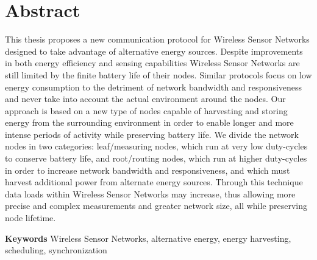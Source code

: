 
\chapter*{Abstract}

This thesis proposes a new communication protocol for Wireless Sensor Networks
designed to take advantage of alternative energy sources. Despite improvements
in both energy efficiency and sensing capabilities Wireless Sensor Networks are
still limited by the finite battery life of their nodes. Similar protocols
focus on low energy consumption to the detriment of network bandwidth and
responsiveness and never take into account the actual environment around the
nodes. Our approach is based on a new type of nodes capable of harvesting and
storing energy from the surrounding environment in order to enable longer and
more intense periods of activity while preserving battery life. We divide the
network nodes in two categories: leaf/measuring nodes, which run at very low
duty-cycles to conserve battery life, and root/routing nodes, which run at
higher duty-cycles in order to increase network bandwidth and responsiveness,
and which must harvest additional power from alternate energy sources. Through
this technique data loads within Wireless Sensor Networks may increase, thus
allowing more precise and complex measurements and greater network size, all
while preserving node lifetime.

\vspace{\baselineskip}

\textbf{Keywords} Wireless Sensor Networks, alternative energy, energy
harvesting, scheduling, synchronization


